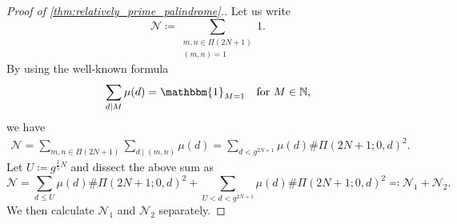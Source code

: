 \documentclass{amsart}
\theoremstyle{plain}
\theoremstyle{definition}
\begin{document}
\begin{proof}[Proof of \cref{thm:relatively_prime_palindrome}.]
Let us write
\[
\mathscr{N}
\coloneqq
\sum_{\substack{
m,n\in\Pi(2N+1)\\
(m,n)=1
}}
1.
\]
By using the well-known formula
\[
\sum_{d\mid M}\mu(d)
=
\mathbbm{1}_{M=1}
\quad\text{for $M\in\mathbb{N}$},
\]
we have
\begin{align}
\mathscr{N}
=
\sum_{m,n\in\Pi(2N+1)}
\sum_{d\mid(m,n)}
\mu(d)
=
\sum_{d<g^{2N+1}}
\mu(d)
\#\Pi(2N+1;0,d)^{2}.
\end{align}
Let $U\coloneqq g^{\frac{1}{5}N}$ and dissect the above sum as
\begin{equation}
\label{thm:relatively_prime_palindrome:N_N1_N2}
\mathscr{N}
=
\sum_{d\le U}
\mu(d)
\#\Pi(2N+1;0,d)^{2}
+
\sum_{U<d<g^{2N+1}}
\mu(d)
\#\Pi(2N+1;0,d)^{2}
\eqqcolon
\mathscr{N}_{1}+\mathscr{N}_{2}.
\end{equation}
We then calculate $\mathscr{N}_{1}$ and $\mathscr{N}_{2}$ separately.


\end{proof}
\end{document}
